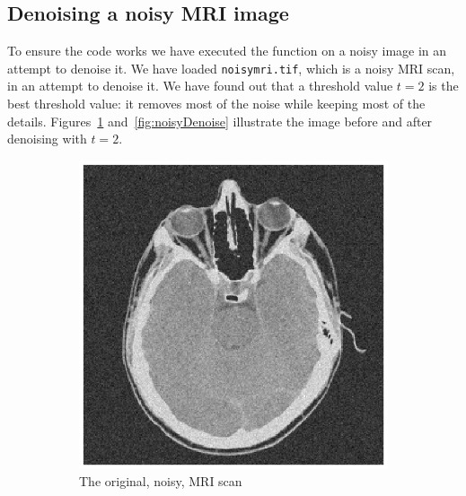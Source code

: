 \subsection{Denoising a noisy MRI image}
To ensure the code works we have executed the function on a noisy image in an attempt to denoise it. We have loaded \texttt{noisymri.tif}, which is a noisy MRI scan, in an attempt to denoise it. We have found out that a threshold value $t = 2$ is the best threshold value: it removes most of the noise while keeping most of the details. Figures~\ref{fig:noisyOrig} and~\ref{fig:noisyDenoise} illustrate the image before and after denoising with $t = 2$.
\begin{figure}[htb]
\centering
\begin{subfigure}{.5\textwidth}
  \centering
  \includegraphics[scale=.7]{noisyMRI.eps}
  \caption{The original, noisy, MRI scan\newline}
  \label{fig:noisyOrig}
\end{subfigure}%
\centering
\begin{subfigure}{.5\textwidth}
  \centering

\end{subfigure}
\end{figure}
